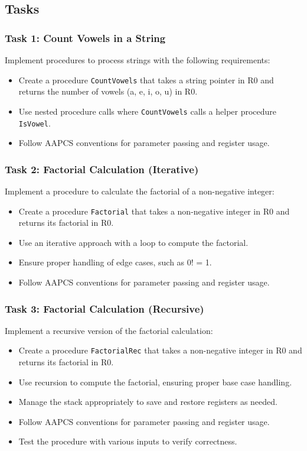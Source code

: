 \subsection{Tasks}

\subsubsection{Task 1: Count Vowels in a String}
Implement procedures to process strings with the following requirements:
\begin{itemize}[nosep]
    \item Create a procedure \texttt{CountVowels} that takes a string pointer in R0 and returns the number of vowels (a, e, i, o, u) in R0.
    \item Use nested procedure calls where \texttt{CountVowels} calls a helper procedure \texttt{IsVowel}.
    \item Follow AAPCS conventions for parameter passing and register usage.
\end{itemize}

\subsubsection{Task 2: Factorial Calculation (Iterative)}
Implement a procedure to calculate the factorial of a non-negative integer:
\begin{itemize}[nosep]
    \item Create a procedure \texttt{Factorial} that takes a non-negative integer in R0 and returns its factorial in R0.
    \item Use an iterative approach with a loop to compute the factorial.
    \item Ensure proper handling of edge cases, such as 0! = 1.
    \item Follow AAPCS conventions for parameter passing and register usage.
\end{itemize}
\subsubsection{Task 3: Factorial Calculation (Recursive)}
Implement a recursive version of the factorial calculation:
\begin{itemize}[nosep]
    \item Create a procedure \texttt{FactorialRec} that takes a non-negative integer in R0 and returns its factorial in R0.
    \item Use recursion to compute the factorial, ensuring proper base case handling.
    \item Manage the stack appropriately to save and restore registers as needed.
    \item Follow AAPCS conventions for parameter passing and register usage.
    \item Test the procedure with various inputs to verify correctness.
\end{itemize}